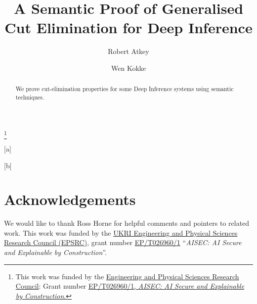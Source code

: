 \documentclass{lmcs}
\begin{document}
\title{A Semantic Proof of Generalised Cut Elimination for Deep Inference}
\thanks{This work was funded by the
  \href{https://www.ukri.org/about-us/epsrc/}{Engineering and Physical
    Sciences Research Council}: Grant number
  \href{https://gow.epsrc.ukri.org/NGBOViewGrant.aspx?GrantRef=EP/T026960/1}{EP/T026960/1,
    \emph{AISEC: AI Secure and Explainable by Construction}.}}

\author[R. Atkey]{Robert Atkey}[a]
\author[W. Kokke]{Wen Kokke}[b]

\address{Mathematically Structured Programming Group\\
  Computer and Information Sciences\\
  University of Strathclyde\\
  Glasgow, Scotland, UK}

\address{Well-Typed}

\begin{abstract}
  We prove cut-elimination properties for some Deep Inference systems
  using semantic techniques.
\end{abstract}

\maketitle








\section*{Acknowledgements}

We would like to thank Ross Horne for helpful comments and pointers to
related work. This work was funded by the
\href{https://www.ukri.org/about-us/epsrc/}{UKRI Engineering and
  Physical Sciences Research Council (EPSRC)}, grant number
\href{https://gow.epsrc.ukri.org/NGBOViewGrant.aspx?GrantRef=EP/T026960/1}{EP/T026960/1}
``\emph{AISEC: AI Secure and Explainable by Construction}''.





% 
\end{document}
